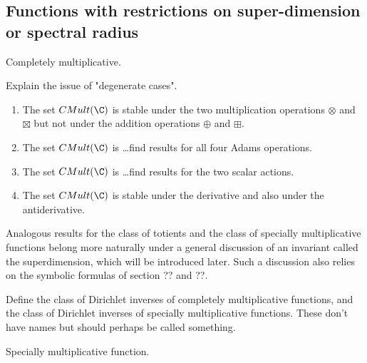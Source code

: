 \documentclass[a4paper]{article}
\begin{document}
\subsection{Functions with restrictions on super-dimension or spectral radius}



\begin{definition}
Completely multiplicative.
\end{definition}

\begin{remark}
Explain the issue of "degenerate cases".
\end{remark}

\begin{proposition}
\begin{enumerate}
\item The set $CMult(\C)$ is stable under the two multiplication operations $\otimes$ and $\boxtimes$ but not under the addition operations $\oplus$ and $\boxplus$.
\item The set $CMult(\C)$ is \ldots find results for all four Adams operations.
\item The set $CMult(\C)$ is \ldots find results for the two scalar actions.
\item The set $CMult(\C)$ is stable under the derivative and also under the antiderivative.
\end{enumerate}
\end{proposition}

Analogous results for the class of totients and the class of specially multiplicative functions belong more naturally under a general discussion of an invariant called the superdimension, which will be introduced later. Such a discussion also relies on the symbolic formulas of section ?? and ??.




\begin{remark}
Define the class of Dirichlet inverses of completely multiplicative functions, and the class of Dirichlet inverses of specially multiplicative functions. These don't have names but should perhaps be called something.
\end{remark}



\begin{definition}
Specially multiplicative function.
\end{definition}
\end{document}
